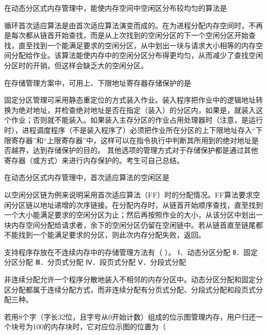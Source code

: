 \question 在动态分区式内存管理中，能使内存空间中空闲区分布较均匀的算法是
\par{}
\begin{solution}循环首次适应算法是由首次适应算法演变而成的。在为进程分配内存空间时，不再是每次都从链首开始查找，而是从上次找到的空闲分区的下一个空闲分区开始查找，直至找到一个能满足要求的空闲分区，从中划出一块与请求大小相等的内存空间分配给作业。该算法能使内存中的空闲分区分布得更均匀，从而减少了查找空闲分区时的开销，但这样会缺乏大的空闲分区。
\end{solution}
\question 在存储管理方案中，可用上、下限地址寄存器存储保护的是
\par{}
\begin{solution}固定分区管理可采用静态重定位的方式装入作业。装入程序把作业中的逻辑地址转换为绝对地址，并检查绝对地址是否在指定（装入）的分区内，如果是，就装入这个作业；否则就不能装入。如果装入主存分区的作业占用处理器时（注意，是运行时），进程调度程序（不是装入程序了）必须把作业所在分区的上下限地址存入``下限寄存器''和``上限寄存器''中，这样可以在指令执行中判断其所用到的绝对地址是否越界，达到存储保护的目的。
其他选项的管理方式对于存储保护都是通过其他寄存器（或方式）来进行内存保护的。考生可自己总结。
\end{solution}
\question 在动态分区式内存管理中，首次适应算法的空闲区是
\par{}
\begin{solution}以空闲分区链为例来说明采用首次适应算法（FF）时的分配情况。FF算法要求空闲分区链以地址递增的次序链接。在分配内存时，从链首开始顺序查找，直至找到一个大小能满足要求的空闲分区为止；然后再按照作业的大小，从该分区中划出一块内存空间分配给请求者，余下的空闲分区仍留在空闲链中。若从链首直至链尾都不能找到一个能满足要求的分区，则此次内存分配失败，返回。
\end{solution}
\question 支持程序存放在不连续内存中的存储管理方法有（ ）。 Ⅰ．动态分区分配
Ⅱ．固定分区分配 Ⅲ．分页式分配 Ⅳ．段页式分配 Ⅴ．分段式分配
\par{}
\begin{solution}非连续分配允许一个程序分散地装入不相邻的内存分区中。动态分区分配和固定分区分配都属于连续分配方式，而非连续分配有分页式分配、分段式分配和段页式分配三种。
\end{solution}
\question 若用8个字（字长32位，且字号从0开始计数）组成的位示图管理内存，用户归还一个块号为100的内存块时，它对应位示图的位置为（
